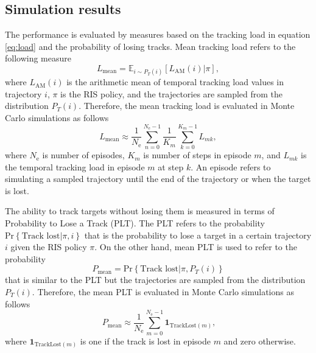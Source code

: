 \documentclass[english, 12pt, a4paper, elec, utf8, a-1b, online]{aaltothesis}
\numberwithin{equation}{section}
\newcommand{\Ne}{N_\text{e}}
\renewcommand{\vec}[1]{\mathbf{#1}}
\renewcommand{\Pr}[1]{\text{Pr}\left\{ #1 \right\}}
\begin{document}
\subsection{Simulation results}\label{sec:ri_sim}

The performance is evaluated by measures based on the tracking load in equation \eqref{eq:load} and the probability of losing tracks. 
Mean tracking load refers to the following measure
\begin{equation} 
    L_\text{mean} = \mathbb{E}_{i \sim P_T(i)} \left[ L_\text{AM}(i) | \pi \right],
\end{equation}
where $L_\text{AM}(i)$ is the arithmetic mean of temporal tracking load values in trajectory $i$,  $\pi$ is the RIS policy, and the trajectories are sampled from the distribution $P_T(i)$.
Therefore, the mean tracking load is evaluated in Monte Carlo simulations as follows
\begin{equation}\label{eq:criterion_load}
    L_\text{mean} \approx \frac{1}{\Ne} \sum_{n=0}^{\Ne-1} \frac{1}{K_m}\sum_{k=0}^{K_m-1} L_{mk},
\end{equation}
where $\Ne$ is number of episodes, $K_m$ is number of steps in episode $m$, and $L_{mk}$ is the temporal tracking load in episode $m$ at step $k$.
An episode refers to simulating a sampled trajectory until the end of the trajectory or when the target is lost.

The ability to track targets without losing them is measured in terms of Probability to Lose a Track (PLT).
The PLT refers to the probability $\Pr{\text{Track lost}|\pi, i}$ that is the probability to lose a target in a certain trajectory $i$ given the RIS policy $\pi$.
On the other hand, mean PLT is used to refer to the probability
\begin{equation}
    P_\text{mean} = \Pr{\text{Track lost}|\pi, P_T(i)}
\end{equation} that is similar to the PLT but the trajectories are sampled from the distribution $P_T(i)$.
Therefore, the mean PLT is evaluated in Monte Carlo simulations as follows
\begin{equation}\label{eq:criterion_lost}
\   P_\text{mean} \approx \frac{1}{\Ne} \sum_{m=0}^{\Ne-1} \vec{1}_{\text{TrackLost}(m)},
\end{equation}
where $\vec{1}_{\text{TrackLost}(m)}$ is one if the track is lost in episode $m$ and zero otherwise.
\end{document}
